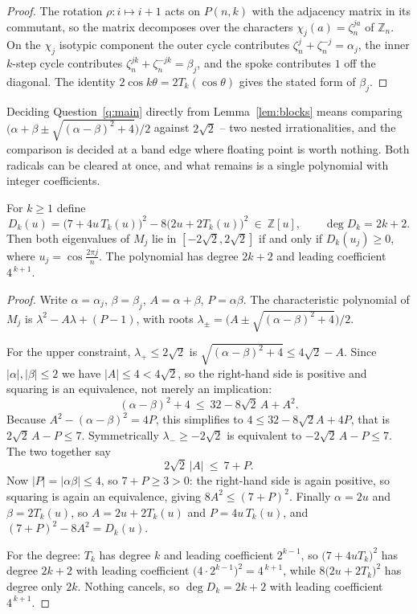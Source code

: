 \begin{proof}
The rotation $\rho:i\mapsto i+1$ acts on $P(n,k)$ with the adjacency matrix in
its commutant, so the matrix decomposes over the characters
$\chi_j(a)=\zeta_n^{ja}$ of $\mathbb Z_n$. On the $\chi_j$ isotypic component
the outer cycle contributes $\zeta_n^{j}+\zeta_n^{-j}=\alpha_j$, the inner
$k$-step cycle contributes $\zeta_n^{jk}+\zeta_n^{-jk}=\beta_j$, and the spoke
contributes $1$ off the diagonal. The identity
$2\cos k\theta=2T_k(\cos\theta)$ gives the stated form of $\beta_j$.
\end{proof}

Deciding Question~\ref{q:main} directly from Lemma~\ref{lem:blocks} means
comparing $\bigl(\alpha+\beta\pm\sqrt{(\alpha-\beta)^2+4}\bigr)/2$ against
$2\sqrt2$ -- two nested irrationalities, and the comparison is decided at a band
edge where floating point is worth nothing. Both radicals can be cleared at
once, and what remains is a single polynomial with integer coefficients.

\begin{theorem}[Criterion]\label{thm:crit}
For $k\ge1$ define
\[
  D_k(u)=\bigl(7+4u\,T_k(u)\bigr)^2-8\bigl(2u+2T_k(u)\bigr)^2\ \in\ \mathbb Z[u],
  \qquad \deg D_k=2k+2 .
\]
Then both eigenvalues of $M_j$ lie in $[-2\sqrt2,2\sqrt2]$ if and only if
$D_k(u_j)\ge0$, where $u_j=\cos\frac{2\pi j}{n}$. The polynomial has degree
$2k+2$ and leading coefficient $4^{\,k+1}$.
\end{theorem}

\begin{proof}
Write $\alpha=\alpha_j$, $\beta=\beta_j$, $A=\alpha+\beta$, $P=\alpha\beta$.
The characteristic polynomial of $M_j$ is $\lambda^2-A\lambda+(P-1)$, with roots
$\lambda_\pm=\bigl(A\pm\sqrt{(\alpha-\beta)^2+4}\bigr)/2$.

For the upper constraint, $\lambda_+\le2\sqrt2$ is
$\sqrt{(\alpha-\beta)^2+4}\le4\sqrt2-A$. Since $|\alpha|,|\beta|\le2$ we have
$|A|\le4<4\sqrt2$, so the right-hand side is positive and squaring is an
equivalence, not merely an implication:
\[
  (\alpha-\beta)^2+4\ \le\ 32-8\sqrt2\,A+A^2 .
\]
Because $A^2-(\alpha-\beta)^2=4P$, this simplifies to $4\le32-8\sqrt2A+4P$,
that is $2\sqrt2\,A-P\le7$. Symmetrically $\lambda_-\ge-2\sqrt2$ is equivalent
to $-2\sqrt2\,A-P\le7$. The two together say
\[
  2\sqrt2\,|A|\ \le\ 7+P .
\]
Now $|P|=|\alpha\beta|\le4$, so $7+P\ge3>0$: the right-hand side is again
positive, so squaring is again an equivalence, giving $8A^2\le(7+P)^2$. Finally
$\alpha=2u$ and $\beta=2T_k(u)$, so $A=2u+2T_k(u)$ and $P=4u\,T_k(u)$, and
$(7+P)^2-8A^2=D_k(u)$.

For the degree: $T_k$ has degree $k$ and leading coefficient $2^{k-1}$, so
$\bigl(7+4uT_k\bigr)^2$ has degree $2k+2$ with leading coefficient
$\bigl(4\cdot2^{k-1}\bigr)^2=4^{\,k+1}$, while $8\bigl(2u+2T_k\bigr)^2$ has
degree only $2k$. Nothing cancels, so $\deg D_k=2k+2$ with leading coefficient
$4^{\,k+1}$.
\end{proof}

